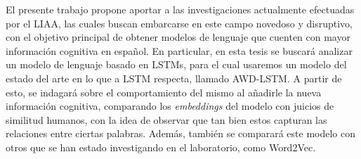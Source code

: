 El presente trabajo propone aportar a las investigaciones actualmente efectuadas por el LIAA, las cuales buscan embarcarse en este campo novedoso y disruptivo, con el objetivo principal de obtener modelos de lenguaje que cuenten con mayor información cognitiva en español. En particular, en esta tesis se buscará analizar un modelo de lenguaje basado en LSTMs, para el cual usaremos un modelo del estado del arte en lo que a LSTM respecta, llamado AWD-LSTM. A partir de esto, se indagará sobre el comportamiento del mismo al añadirle la nueva información cognitiva, comparando los \textit{embeddings} del modelo con juicios de similitud humanos, con la idea de observar que tan bien estos capturan las relaciones entre ciertas palabras. Además, también se comparará este modelo con otros que se han estado investigando en el laboratorio, como Word2Vec.
